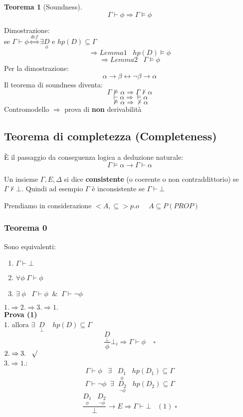 \documentclass{article}
\newtheorem{theorem}{Teorema}
\theoremstyle{break}
\theoremstyle{break}
\theoremstyle{break}
\theoremstyle{break}
\begin{document}
\begin{theorem} [Soundness]
  \[
  \Gamma \vdash \phi \Rightarrow \Gamma \models \phi
  \] 
\end{theorem}
Dimostrazione:\\
se \( \Gamma \vdash \phi \stackrel{def}{\Leftrightarrow} \exists \underset{\phi}{D} \) e \( hp(D) \subseteq \Gamma \)  
\[
  \Rightarrow Lemma1\;\;\; hp(D) \models \phi
\] 
\[
\Rightarrow Lemma2\;\;\; \Gamma \models \phi
\] 
Per la dimostrazione:
\[
  \alpha \to \beta \leftrightarrow \neg \beta \to \alpha
\] 
Il teorema di soundness diventa:
\[
\Gamma \not\models \alpha \Rightarrow \Gamma \not\vdash \alpha
\]
\[
\vdash \alpha \Rightarrow \models \alpha
\] 
\[
\not\models \alpha \Rightarrow \not\vdash \alpha
\] 
Contromodello \( \Rightarrow \) prova di \textbf{non} derivabilità

\subsection{Teorema di completezza (Completeness)}
È il passaggio da conseguenza logica a deduzione naturale: 
\[
    \Gamma \models \alpha \to  \Gamma \vdash \alpha 
\] 
\begin{definition}
  Un insieme \( \Gamma, E, \Delta \) si dice \textbf{consistente} (o coerente o non contraddittorio)
  se \( \Gamma \not\vdash \bot \). Quindi ad esempio \( \Gamma \) è inconsistente se
  \( \Gamma \vdash \bot \) 
\end{definition}
Prendiamo in considerazione \(<A, \subseteq> p.o\;\;\;\;\; A \subseteq P(PROP) \) 
\subsubsection{Teorema 0}
Sono equivalenti:
\begin{enumerate}
  \item \( \Gamma \vdash \bot \) 
  \item \( \forall \phi \; \Gamma \vdash \phi \) 
  \item \( \exists \; \phi\;\;\; \Gamma \vdash \phi\;\; \&\;\; \Gamma \vdash \neg \phi \) 
\end{enumerate}
\( 1. \Rightarrow 2. \Rightarrow 3. \Rightarrow 1. \)\\
\textbf{Prova (1)}\\
1. allora \( \exists\;\; \underset{\bot}{D} \;\;\;\; hp(D) \subseteq \Gamma \) 
\[
  \frac{\underset{\bot}{D}}{\phi}\bot_i \Rightarrow \Gamma \vdash \phi \;\;\;\; \square
\] 
\( 2. \Rightarrow 3.\;\;\; \surd \)\\
\( 3. \Rightarrow 1. \):
\[
  \Gamma \vdash \phi\;\;\; \exists \;\;\; \underset{\phi}{D_1} \;\;\; hp(D_1) \subseteq \Gamma
\] 
\[
  \Gamma \vdash \neg \phi \;\; \exists  \;\; \underset{\neg \phi}{D_2} \;\;\; hp(D_2) \subseteq \Gamma
\] 
\[
  \frac{\underset{\phi}{D_1}\;\;\;\underset{\neg \phi}{D_2}}{\bot} \to E \Rightarrow \Gamma \vdash \bot \;\;\; (1)\; \square
\] 
\end{document}
